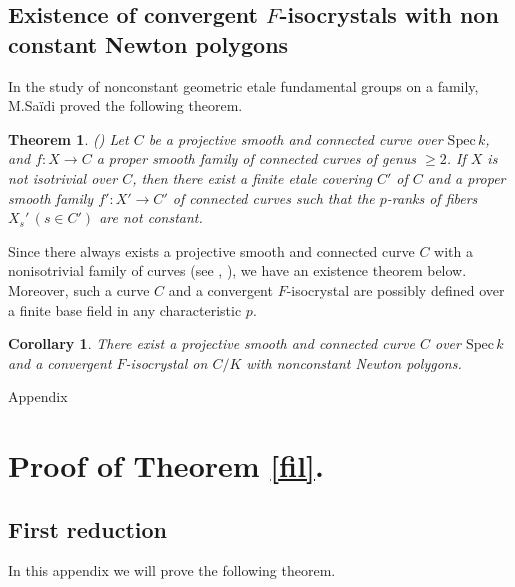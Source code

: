 \documentclass[11pt]{amsart}
\newtheorem{theorem}[Lemma]{Theorem}
\newtheorem{corollary}[Lemma]{Corollary}
\begin{document}
\subsection{Existence of convergent $F$-isocrystals with non constant Newton polygons}\label{nonisotsec}

In the study of nonconstant geometric etale fundamental groups on a family, 
M.Sa\"idi proved the following theorem. 

\begin{theorem}\label{nonisot} \mbox{\rm (\cite[Theorem 4.6]{saidi})} Let $C$ 
be a projective smooth and connected curve over $\mathrm{Spec}\, k$, and $f : X \rightarrow C$ 
a proper smooth family of connected curves of genus $\geq 2$. 
If $X$ is not isotrivial over $C$, then there exist a finite etale covering $C'$ of $C$ 
and a proper smooth family $f' : X' \rightarrow C'$ of connected curves 
such that the $p$-ranks of fibers $X_s'\, (s \in C')$ are not constant. 
\end{theorem}

Since there always exists a projective smooth and connected curve $C$ with 
a nonisotrivial family of curves (see \cite[Theorem 3.1]{oort},  \cite{Dia}), 
we have an existence theorem below. 
Moreover, such a curve $C$ and a convergent $F$-isocrystal are possibly defined 
over a finite base field in any characteristic $p$. 

\begin{corollary}\label{extncnp} 
There exist a projective smooth and connected curve $C$ over $\mathrm{Spec}\, k$ 
and a convergent $F$-isocrystal on $C/K$ with nonconstant Newton polygons.
\end{corollary}

\vspace*{5mm}

\appendix

\begin{center}
{\large Appendix}
\end{center}

\section{Proof of Theorem \ref{fil}.}\label{esf}

\subsection{First reduction}\label{filas}

In this appendix we will prove the following theorem. 
\end{document}
